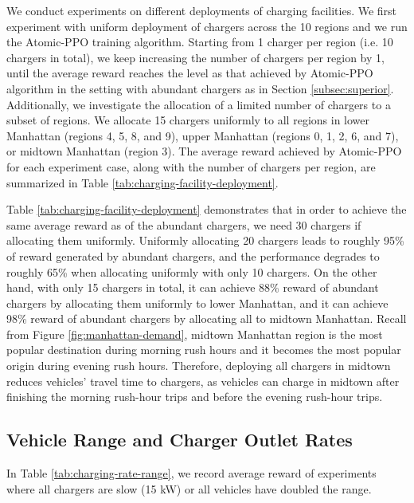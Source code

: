 We conduct experiments on different deployments of charging facilities. We first experiment with uniform deployment of chargers across the 10 regions and we run the Atomic-PPO training algorithm. Starting from 1 charger per region (i.e. 10 chargers in total), we keep increasing the number of chargers per region by 1, until the average reward reaches the level as that achieved by Atomic-PPO algorithm in the setting with abundant chargers as in Section \ref{subsec:superior}. Additionally, we investigate the allocation of a limited number of chargers to a subset of regions. We allocate 15 chargers uniformly to all regions in lower Manhattan (regions 4, 5, 8, and 9), upper Manhattan (regions 0, 1, 2, 6, and 7), or midtown Manhattan (region 3). The average reward achieved by Atomic-PPO for each experiment case, along with the number of chargers per region, are summarized in Table \ref{tab:charging-facility-deployment}.

Table \ref{tab:charging-facility-deployment} demonstrates that in order to achieve the same average reward as of the abundant chargers, we need 30 chargers if allocating them uniformly. Uniformly allocating 20 chargers leads to roughly 95\% of reward generated by abundant chargers, and the performance degrades to roughly 65\% when allocating uniformly with only 10 chargers. On the other hand, with only 15 chargers in total, it can achieve 88\% reward of abundant chargers by allocating them uniformly to lower Manhattan, and it can achieve 98\% reward of abundant chargers by allocating all to midtown Manhattan. Recall from Figure \ref{fig:manhattan-demand}, midtown Manhattan region is the most popular destination during morning rush hours and it becomes the most popular origin during evening rush hours. Therefore, deploying all chargers in midtown reduces vehicles' travel time to chargers, as vehicles can charge in midtown after finishing the morning rush-hour trips and before the evening rush-hour trips.


\subsection{Vehicle Range and Charger Outlet Rates} \label{subsec:range-outlet}
In Table \ref{tab:charging-rate-range}, we record average reward of experiments where all chargers are slow (15 kW) or all vehicles have doubled the range. %

